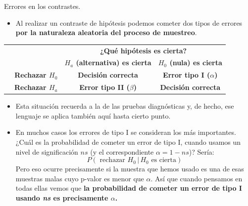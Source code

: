 \documentclass[
  9pt,
  ignorenonframetext,
]{beamer}
\providecommand{\tightlist}{%
  \setlength{\itemsep}{0pt}\setlength{\parskip}{0pt}}
\begin{document}
\begin{frame}{Errores en los contrastes.}
\protect\hypertarget{errores-en-los-contrastes.}{}

\begin{itemize}
\tightlist
\item
  Al realizar un contraste de hipótesis podemos cometer dos tipos de
  errores \textbf{por la naturaleza aleatoria del proceso de muestreo}.
\end{itemize}

\begin{table}[htbp]
    \begin{center}
    \begin{tabular}{cccc}
    \cline{3-4}
    &&\multicolumn{2}{|c|}{\bf ¿Qué hipótesis es cierta?}\\[1mm]
    \cline{3-4}
                                                  &&\multicolumn{1}{|c|}{\bf $H_a$ (alternativa) es cierta}&\multicolumn{1}{|c|}{\bf $H_0$ (nula) es cierta}\\[3mm]
    \cline{2-4}
                                    &\multicolumn{1}{|c|}{\bf Rechazar $H_0$}&\multicolumn{1}{|c|}{\bf Decisión correcta}&\multicolumn{1}{|c|}{\bf Error tipo I ($\alpha$)}\\[3mm]
    \cline{2-4}
                                    &\multicolumn{1}{|c|}{\bf Rechazar $H_a$}&\multicolumn{1}{|c|}{\bf Error tipo II ($\beta$)}&\multicolumn{1}{|c|}{\bf Decisión correcta}\\[3mm]
    \cline{2-4}
    \end{tabular}
\end{center}
\end{table}

\begin{itemize}
\item
  Esta situación recuerda a la de las pruebas diagnósticas y, de hecho,
  ese lenguaje se aplica también aquí hasta cierto punto.
\item
  En muchos casos los errores de tipo I se consideran los más
  importantes. ¿Cuál es la probabilidad de cometer un error de tipo I,
  cuando usamos un nivel de significación \(ns\) (y el correspondiente
  \(\alpha = 1 - ns\))? Sería: \[
  P(\text{ rechazar }H_0\,|\, H_0\text{ es cierta})
  \] Pero eso ocurre precisamente si la muestra que hemos usado es una
  de esas muestras malas cuyo p-valor es menor que \(\alpha\). Así que
  cuando pensamos en todas ellas vemos que \textbf{la probabilidad de
  cometer un error de tipo I usando \emph{ns} es precisamente
  \(\alpha\).}
\end{itemize}

\end{frame}
\end{document}
